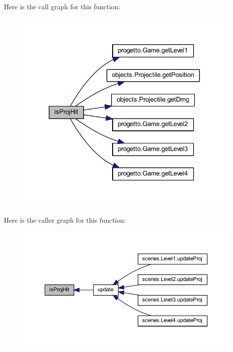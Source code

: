 Here is the call graph for this function\+:\nopagebreak
\begin{figure}[H]
\begin{center}
\leavevmode
\includegraphics[width=312pt]{classmanagers_1_1_projectile_manager_a90bf53002c3a067a25aba3e876974051_cgraph}
\end{center}
\end{figure}
Here is the caller graph for this function\+:
\nopagebreak
\begin{figure}[H]
\begin{center}
\leavevmode
\includegraphics[width=350pt]{classmanagers_1_1_projectile_manager_a90bf53002c3a067a25aba3e876974051_icgraph}
\end{center}
\end{figure}
\mbox{\label{classmanagers_1_1_projectile_manager_ad4505ed80d64e9561393c0406fe7d904}} 
